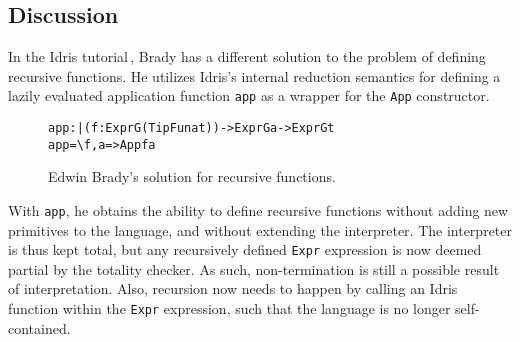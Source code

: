 \subsection{Discussion}

In the Idris tutorial\,\cite{Brady:IdrisTutorial}, Brady has a different solution to the problem of defining recursive functions. He utilizes Idris's internal reduction semantics for defining a lazily evaluated application function \texttt{app} as a wrapper for the \texttt{App} constructor. 

\begin{figure}
\begin{alltt}
app : |(f : Expr G (TipFun a t)) -> Expr G a -> Expr G t
app = \textbackslash{f}, a => App f a
\end{alltt}
\caption{Edwin Brady's solution for recursive functions.}
\end{figure}

With \texttt{app}, he obtains the ability to define recursive functions without adding new primitives to the language, and without extending the interpreter. The interpreter is thus kept total, but any recursively defined \texttt{Expr} expression is now deemed partial by the totality checker. As such, non-termination is still a possible result of interpretation. Also, recursion now needs to happen by calling an Idris function within the \texttt{Expr} expression, such that the language is no longer self-contained.
